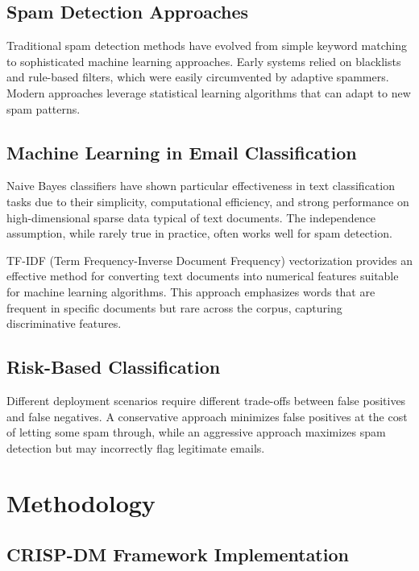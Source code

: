 \documentclass[12pt,a4paper]{article}
\begin{document}
\subsection{Spam Detection Approaches}

Traditional spam detection methods have evolved from simple keyword matching to sophisticated machine learning approaches. Early systems relied on blacklists and rule-based filters, which were easily circumvented by adaptive spammers. Modern approaches leverage statistical learning algorithms that can adapt to new spam patterns.

\subsection{Machine Learning in Email Classification}

Naive Bayes classifiers have shown particular effectiveness in text classification tasks due to their simplicity, computational efficiency, and strong performance on high-dimensional sparse data typical of text documents. The independence assumption, while rarely true in practice, often works well for spam detection.

TF-IDF (Term Frequency-Inverse Document Frequency) vectorization provides an effective method for converting text documents into numerical features suitable for machine learning algorithms. This approach emphasizes words that are frequent in specific documents but rare across the corpus, capturing discriminative features.

\subsection{Risk-Based Classification}

Different deployment scenarios require different trade-offs between false positives and false negatives. A conservative approach minimizes false positives at the cost of letting some spam through, while an aggressive approach maximizes spam detection but may incorrectly flag legitimate emails.

\section{Methodology}

\subsection{CRISP-DM Framework Implementation}
\end{document}
